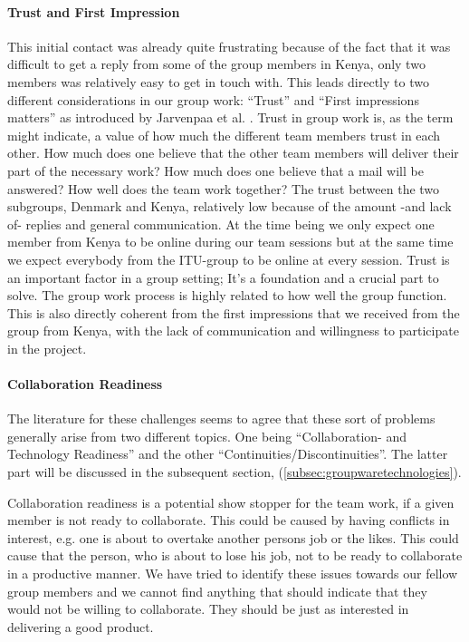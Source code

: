 \paragraph{Trust and First Impression} \label{par:trustandfirstimpressions}
This initial contact was already quite frustrating because of the fact that it was difficult to get a reply from some of the group members in Kenya, only two members was relatively easy to get in touch with. This leads directly to two different considerations in our group work: ``Trust'' and ``First impressions matters'' as introduced by Jarvenpaa et al. \cite{jarvenpaa1998communication}. Trust in group work is, as the term might indicate, a value of how much the different team members trust in each other. How much does one believe that the other team members will deliver their part of the necessary work? How much does one believe that a mail will be answered? How well does the team work together? The trust between the two subgroups, Denmark and Kenya, relatively low because of the amount -and lack of- replies and general communication. At the time being we only expect one member from Kenya to be online during our team sessions but at the same time we expect everybody from the ITU-group to be online at every session. Trust is an important factor in a group setting; It's a foundation and a crucial part to solve. The group work process is highly related to how well the group function. This is also directly coherent from the first impressions that we received from the group from Kenya, with the lack of communication and willingness to participate in the project. 

\paragraph{Collaboration Readiness} \label{par:collaborationreadiness}
The literature for these challenges seems to agree that these sort of problems generally arise from two different topics. One being ``Collaboration- and Technology Readiness'' and the other ``Continuities/Discontinuities''. The latter part will be discussed in the subsequent section,  (\ref{subsec:groupwaretechnologies}).

Collaboration readiness is a potential show stopper for the team work, if a given member is not ready to collaborate. This could be caused by having conflicts in interest, e.g. one is about to overtake another persons job or the likes. This could cause that the person, who is about to lose his job, not to be ready to collaborate in a productive manner. We have tried to identify these issues towards our fellow group members and we cannot find anything that should indicate that they would not be willing to collaborate. They should be just as interested in delivering a good product. 

